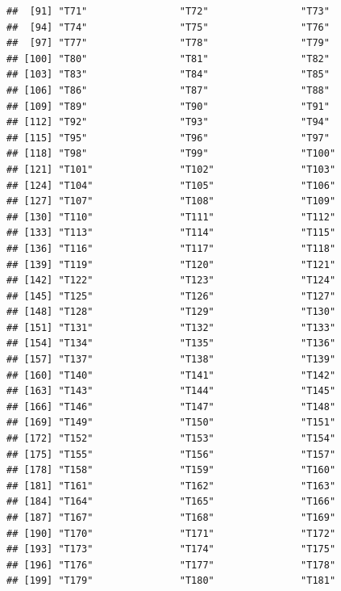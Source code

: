 \documentclass[]{book}
\begin{document}
\begin{verbatim}
##  [91] "T71"                "T72"                "T73"               
##  [94] "T74"                "T75"                "T76"               
##  [97] "T77"                "T78"                "T79"               
## [100] "T80"                "T81"                "T82"               
## [103] "T83"                "T84"                "T85"               
## [106] "T86"                "T87"                "T88"               
## [109] "T89"                "T90"                "T91"               
## [112] "T92"                "T93"                "T94"               
## [115] "T95"                "T96"                "T97"               
## [118] "T98"                "T99"                "T100"              
## [121] "T101"               "T102"               "T103"              
## [124] "T104"               "T105"               "T106"              
## [127] "T107"               "T108"               "T109"              
## [130] "T110"               "T111"               "T112"              
## [133] "T113"               "T114"               "T115"              
## [136] "T116"               "T117"               "T118"              
## [139] "T119"               "T120"               "T121"              
## [142] "T122"               "T123"               "T124"              
## [145] "T125"               "T126"               "T127"              
## [148] "T128"               "T129"               "T130"              
## [151] "T131"               "T132"               "T133"              
## [154] "T134"               "T135"               "T136"              
## [157] "T137"               "T138"               "T139"              
## [160] "T140"               "T141"               "T142"              
## [163] "T143"               "T144"               "T145"              
## [166] "T146"               "T147"               "T148"              
## [169] "T149"               "T150"               "T151"              
## [172] "T152"               "T153"               "T154"              
## [175] "T155"               "T156"               "T157"              
## [178] "T158"               "T159"               "T160"              
## [181] "T161"               "T162"               "T163"              
## [184] "T164"               "T165"               "T166"              
## [187] "T167"               "T168"               "T169"              
## [190] "T170"               "T171"               "T172"              
## [193] "T173"               "T174"               "T175"              
## [196] "T176"               "T177"               "T178"              
## [199] "T179"               "T180"               "T181"              

\end{verbatim}
\end{document}
